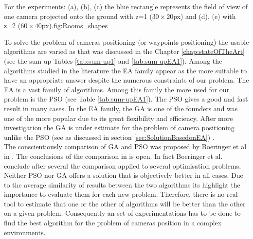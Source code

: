 \begin{mfigures}[!]{For the experiments: (a), (b), (c) the blue rectangle represents the field of view of one camera projected onto the ground  with z=1 ($30 \times 20 $px) and (d), (e) with z=2 ($60 \times 40 $px).}{fig:Rooms_shapes} \centering
{}
\hspace{1cm}
\hspace{1cm}
\end{mfigures}  
To solve the problem of cameras positioning (or waypoints positioning) the usable algorithms are varied as that was discussed in the Chapter \ref{chap:stateOfTheArt} (see the sum-up Tables \ref{tab:sum-up1} and \ref{tab:sum-upEA1}).
Among the algorithms studied in the literature the EA family appear as the more suitable to have an appropriate answer despite the numerous constraints of our problem. The EA is a vast family of algorithms. Among this family the more used for our problem is the PSO (see  Table \ref{tab:sum-upEA1}). The PSO gives a good and fast result in many cases. In the EA family, the GA is one of the founders and was one of the more popular due to its great flexibility and efficiency.
 After more investigation the GA is under estimate for the problem of camera positioning unlike the PSO (see \citep{33*reddy2012,8*zhou2011,84*xu2011,143*maji2015,193*fu2014,194*fu2010} as discussed in section \ref{sec:SolutionBasedonEA}) . \\
 The  conscientiously comparison  of GA and PSO was proposed by Boeringer et al in \citep{78*boeringer2004}. The conclusions  of the comparison in \citep{78*boeringer2004} is open. In fact Boeringer et al.  \citep{78*boeringer2004} conclude after several the comparison applied to several optimisation problems, Neither PSO nor GA offers a solution that is objectively better in all cases. Due to the average similarity of results between the two algorithms its highlight the importance to evaluate them for each new problem.
  Therefore, there is no real tool to estimate that one or the other of algorithms will be better than the other on a given problem.
 Consequently an  set  of experimentations has to be done to find the best algorithm for the problem of cameras position in a complex environments. 



